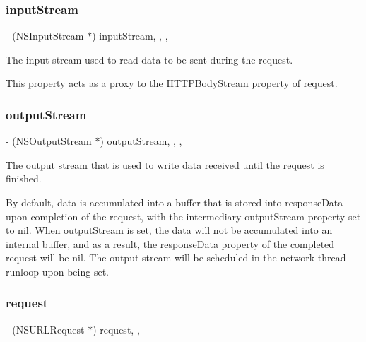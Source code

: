 \subsubsection{\texorpdfstring{input\+Stream}{inputStream}}
{\footnotesize\ttfamily -\/ (N\+S\+Input\+Stream $\ast$) input\+Stream\hspace{0.3cm}{\ttfamily [read]}, {\ttfamily [write]}, {\ttfamily [nonatomic]}, {\ttfamily [strong]}}

The input stream used to read data to be sent during the request.

This property acts as a proxy to the {\ttfamily H\+T\+T\+P\+Body\+Stream} property of {\ttfamily request}. \mbox{\label{interface_a_f_u_r_l_connection_operation_a6778c4ebc8739292f8aa0ebdffba0749}} 
\subsubsection{\texorpdfstring{output\+Stream}{outputStream}}
{\footnotesize\ttfamily -\/ (N\+S\+Output\+Stream $\ast$) output\+Stream\hspace{0.3cm}{\ttfamily [read]}, {\ttfamily [write]}, {\ttfamily [nonatomic]}, {\ttfamily [strong]}}

The output stream that is used to write data received until the request is finished.

By default, data is accumulated into a buffer that is stored into {\ttfamily response\+Data} upon completion of the request, with the intermediary {\ttfamily output\+Stream} property set to {\ttfamily nil}. When {\ttfamily output\+Stream} is set, the data will not be accumulated into an internal buffer, and as a result, the {\ttfamily response\+Data} property of the completed request will be {\ttfamily nil}. The output stream will be scheduled in the network thread runloop upon being set. \mbox{\label{interface_a_f_u_r_l_connection_operation_a396bdfca5d7ad65dbface0a6df2c207c}} 
\subsubsection{\texorpdfstring{request}{request}}
{\footnotesize\ttfamily -\/ (N\+S\+U\+R\+L\+Request $\ast$) request\hspace{0.3cm}{\ttfamily [read]}, {\ttfamily [nonatomic]}, {\ttfamily [strong]}}


